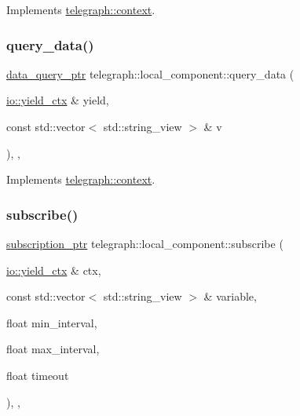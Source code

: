 Implements \hyperlink{classtelegraph_1_1context_a301114c9b73194507ae58221566a3e57}{telegraph\+::context}.

\mbox{\label{classtelegraph_1_1local__component_ad8c3abb4f9e6ab31b0590beac901eec5}} 
\subsubsection{\texorpdfstring{query\+\_\+data()}{query\_data()}\hspace{0.1cm}{\footnotesize\ttfamily [2/2]}}
{\footnotesize\ttfamily \hyperlink{namespacetelegraph_a6ffe775ac48dca2a4013b53d692199c8}{data\+\_\+query\+\_\+ptr} telegraph\+::local\+\_\+component\+::query\+\_\+data (\begin{DoxyParamCaption}\item[{\hyperlink{structboost_1_1asio_1_1yield__ctx}{io\+::yield\+\_\+ctx} \&}]{yield,  }\item[{const std\+::vector$<$ std\+::string\+\_\+view $>$ \&}]{v }\end{DoxyParamCaption})\hspace{0.3cm}{\ttfamily [inline]}, {\ttfamily [override]}, {\ttfamily [virtual]}}



Implements \hyperlink{classtelegraph_1_1context_a34793623d2a2def580ad0b8710c74c6d}{telegraph\+::context}.

\mbox{\label{classtelegraph_1_1local__component_a53aa0199bd938578a6400cfd3a19c86f}} 
\subsubsection{\texorpdfstring{subscribe()}{subscribe()}\hspace{0.1cm}{\footnotesize\ttfamily [1/2]}}
{\footnotesize\ttfamily \hyperlink{namespacetelegraph_a58641aa5b1a2cbdb0431916a87069f64}{subscription\+\_\+ptr} telegraph\+::local\+\_\+component\+::subscribe (\begin{DoxyParamCaption}\item[{\hyperlink{structboost_1_1asio_1_1yield__ctx}{io\+::yield\+\_\+ctx} \&}]{ctx,  }\item[{const std\+::vector$<$ std\+::string\+\_\+view $>$ \&}]{variable,  }\item[{float}]{min\+\_\+interval,  }\item[{float}]{max\+\_\+interval,  }\item[{float}]{timeout }\end{DoxyParamCaption})\hspace{0.3cm}{\ttfamily [inline]}, {\ttfamily [override]}, {\ttfamily [virtual]}}



